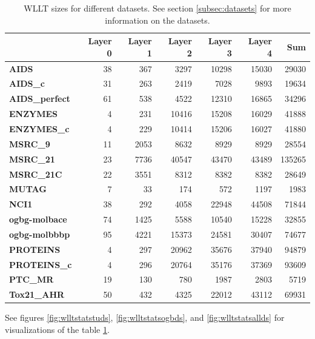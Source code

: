 	\begin{table}[!ht]
		\centering
		\begin{tabular}{|l||r|r|r|r|r||r|}
			\hline
			\textbf{} & \textbf{Layer 0} & \textbf{Layer 1} & \textbf{Layer 2} & \textbf{Layer 3} & \textbf{Layer 4} & \textbf{Sum}\\ \hline\hline
			\textbf{AIDS} & 38 & 367 & 3297 & 10298 & 15030 & 29030 \\ \hline
			\textbf{AIDS\_c} & 31 & 263 & 2419 & 7028 & 9893  & 19634 \\ \hline
			\textbf{AIDS\_perfect} & 61 & 538 & 4522 & 12310 & 16865 & 34296 \\ \hline
			\textbf{ENZYMES} & 4 & 231 & 10416 & 15208 & 16029 & 41888 \\ \hline
			\textbf{ENZYMES\_c} & 4 & 229 & 10414 & 15206 & 16027 & 41880 \\ \hline
			\textbf{MSRC\_9} & 11 & 2053 & 8632 & 8929 & 8929 & 28554 \\ \hline
			\textbf{MSRC\_21} & 23 & 7736 & 40547 & 43470 & 43489 & 135265 \\ \hline
			\textbf{MSRC\_21C} & 22 & 3551 & 8312 & 8382 & 8382 & 28649 \\ \hline
			\textbf{MUTAG} & 7 & 33 & 174 & 572 & 1197 & 1983 \\ \hline
			\textbf{NCI1} & 38 & 292 & 4058 & 22948 & 44508 & 71844 \\ \hline
			\textbf{ogbg-molbace} & 74 & 1425 & 5588 & 10540 & 15228 & 32855 \\ \hline
			\textbf{ogbg-molbbbp} & 95 & 4221 & 15373 & 24581 & 30407 & 74677 \\ \hline
			\textbf{PROTEINS} & 4 & 297 & 20962 & 35676 & 37940 & 94879 \\ \hline
			\textbf{PROTEINS\_c} & 4 & 296 & 20764 & 35176 & 37369 & 93609 \\ \hline
			\textbf{PTC\_MR} & 19 & 130 & 780 & 1987 & 2803 & 5719 \\ \hline
			\textbf{Tox21\_AHR} & 50 & 432 & 4325 & 22012 & 43112 & 69931 \\ \hline
		\end{tabular}
		\caption{WLLT sizes for different datasets. See section \ref{subsec:datasets} for more information on the datasets.}
		\label{tab:WLLTsize}
	\end{table}
	See figures \ref{fig:wlltstatstuds}, \ref{fig:wlltstatsogbds}, and \ref{fig:wlltstatsallds} for visualizations of the table \ref{tab:WLLTsize}.
		
